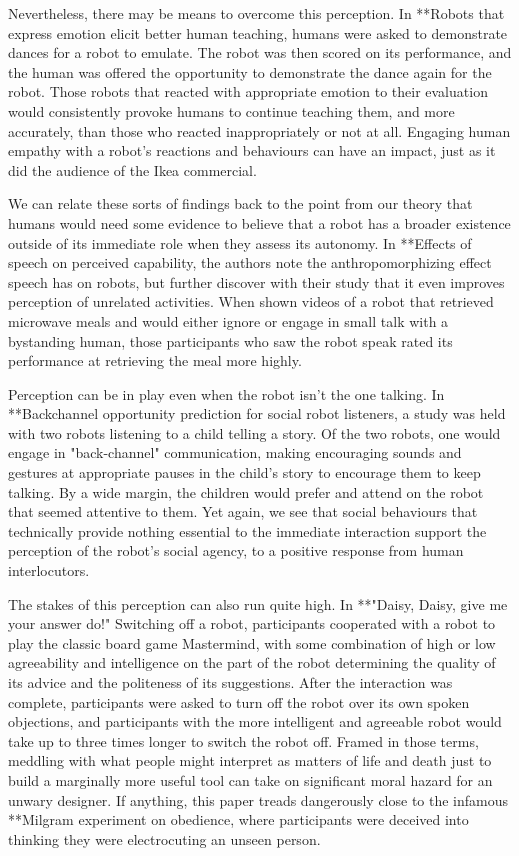 \documentclass{sfuthesis}
\begin{document}
Nevertheless, there may be means to overcome this perception. In **Robots that express emotion elicit better human teaching, humans were asked to demonstrate dances for a robot to emulate. The robot was then scored on its performance, and the human was offered the opportunity to demonstrate the dance again for the robot. Those robots that reacted with appropriate emotion to their evaluation would consistently provoke humans to continue teaching them, and more accurately, than those who reacted inappropriately or not at all. Engaging human empathy with a robot's reactions and behaviours can have an impact, just as it did the audience of the Ikea commercial.

We can relate these sorts of findings back to the point from our theory that humans would need some evidence to believe that a robot has a broader existence outside of its immediate role when they assess its autonomy. In **Effects of speech on perceived capability, the authors note the anthropomorphizing effect speech has on robots, but further discover with their study that it even improves perception of unrelated activities. When shown videos of a robot that retrieved microwave meals and would either ignore or engage in small talk with a bystanding human, those participants who saw the robot speak rated its performance at retrieving the meal more highly. 

Perception can be in play even when the robot isn't the one talking. In **Backchannel opportunity prediction for social robot listeners, a study was held with two robots listening to a child telling a story. Of the two robots, one would engage in "back-channel" communication, making encouraging sounds and gestures at appropriate pauses in the child's story to encourage them to keep talking. By a wide margin, the children would prefer and attend on the robot that seemed attentive to them. Yet again, we see that social behaviours that technically provide nothing essential to the immediate interaction support the perception of the robot's social agency, to a positive response from human interlocutors.

The stakes of this perception can also run quite high. In **"Daisy, Daisy, give me your answer do!" Switching off a robot, participants cooperated with a robot to play the classic board game Mastermind, with some combination of high or low agreeability and intelligence on the part of the robot determining the quality of its advice and the politeness of its suggestions. After the interaction was complete, participants were asked to turn off the robot over its own spoken objections, and participants with the more intelligent and agreeable robot would take up to three times longer to switch the robot off. Framed in those terms, meddling with what people might interpret as matters of life and death just to build a marginally more useful tool can take on significant moral hazard for an unwary designer. If anything, this paper treads dangerously close to the infamous **Milgram experiment on obedience, where participants were deceived into thinking they were electrocuting an unseen person.
\end{document}

